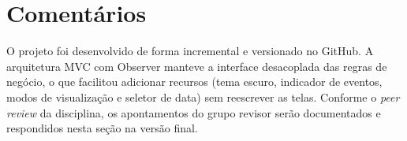 \documentclass[10pt,a4paper]{article}
\begin{document}
\section{Comentários}
O projeto foi desenvolvido de forma incremental e versionado no GitHub. A arquitetura
MVC com Observer manteve a interface desacoplada das regras de negócio, o que facilitou
adicionar recursos (tema escuro, indicador de eventos, modos de visualização e seletor
de data) sem reescrever as telas. Conforme o \emph{peer review} da disciplina, os
apontamentos do grupo revisor serão documentados e respondidos nesta seção na versão
final.
\end{document}
